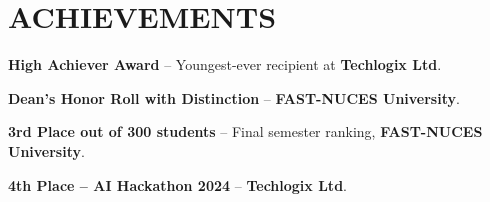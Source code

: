 \documentclass[letterpaper,10pt]{article}
\newenvironment{resume_list}{
  \vspace{-7pt}
  \begin{itemize}[itemsep=-2px, parsep=1pt, leftmargin=30pt]
}{
  \end{itemize}
}
\begin{document}
  \section{ACHIEVEMENTS}

  \begin{resume_list}
    \item \textbf{High Achiever Award} -- Youngest-ever recipient at \textbf{Techlogix Ltd}.
    \item \textbf{Dean's Honor Roll with Distinction} -- \textbf{FAST-NUCES University}.
    \item \textbf{3rd Place out of 300 students} -- Final semester ranking, \textbf{FAST-NUCES University}.
    \item \textbf{4th Place -- AI Hackathon 2024} -- \textbf{Techlogix Ltd}.
  \end{resume_list}
\end{document}
